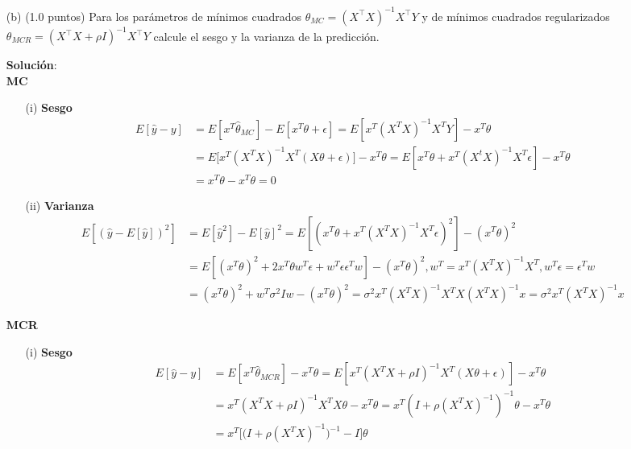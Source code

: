 \documentclass[11pt,letterpaper]{article}
\begin{document}
\begin{itemize}
	\item[(b)] (1.0 puntos) Para los parámetros de mínimos cuadrados $\theta_{MC} = (X^\top X) ^{-1}X^\top Y $  y de  mínimos cuadrados regularizados $\theta_{MCR} = (X^\top X + \rho I) ^{-1}X^\top Y$ calcule el sesgo y la varianza de la predicción.
	
	\textbf{Solución}:\\
	\textbf{MC}
	\begin{itemize}
	    \item[(i)] \textbf{Sesgo}\\
	    \begin{align*}
	        E[\hat{y}-y] & = E[x^{T}\hat{\theta}_{MC}]-E[x^{T}\theta+\epsilon]=E[x^{T}(X^{T}X)^{-1}X^{T}Y]-x^{T}\theta \\
	        & = E\big[x^{T}(X^{T}X)^{-1}X^{T}(X\theta+\epsilon)\big]-x^{T}\theta = E[x^{T}\theta+x^{T}(X^{t}X)^{-1}X^{T}\epsilon] -x^{T}\theta\\
	        & = x^{T}\theta-x^{T}\theta = 0
	    \end{align*}
	    \item[(ii)] \textbf{Varianza}\\
	    \begin{align*}
	    E[(\hat{y}-E[\hat{y}])^{2}] & = E[\hat{y}^{2}]-E[\hat{y}]^{2} = E[(x^{T}\theta+x^{T}(X^{T}X)^{-1}X^{T}\epsilon)^{2}]-(x^{T}\theta)^{2}\\
	    & = E[(x^{T}\theta)^{2}+2x^{T}\theta w^{T}\epsilon+w^{T}\epsilon\epsilon^{T}w]-(x^{T}\theta)^{2}, w^{T} =x^{T}(X^{T}X)^{-1}X^{T}, w^{T}\epsilon=\epsilon^{T} w\\
	    & = (x^{T}\theta)^{2}+w^{T}\sigma^{2}Iw-(x^{T}\theta)^{2} = \sigma^{2}x^{T}(X^{T}X)^{-1}X^{T}X(X^{T}X)^{-1}x=\sigma^{2}x^{T}(X^{T}X)^{-1}x
	    \end{align*}
	\end{itemize}
	\textbf{MCR}
	\begin{itemize}
	    \item[(i)] \textbf{Sesgo}\\
	    \begin{align*}
	    E[\hat{y}-y] &= E[x^{T}\hat{\theta}_{MCR}]-x^{T}\theta=E[x^{T}(X^{T}X+\rho I)^{-1}X^{T}(X\theta+\epsilon)]-x^{T}\theta\\
	    & = x^{T}(X^{T}X+\rho I)^{-1}X^{T}X\theta-x^{T}\theta=x^{T}(I+\rho (X^{T}X)^{-1})^{-1}\theta-x^{T}\theta\\
	    & =  x^{T}\big[\big(I+\rho (X^{T}X)^{-1}\big)^{-1}-I\big]\theta
	    \end{align*}
	    

\end{itemize}
\end{itemize}
\end{document}
